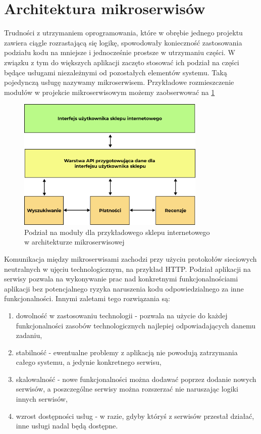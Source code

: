 \documentclass{SGGW-thesis}
\begin{document}
{\section{Architektura mikroserwisów}

Trudności z utrzymaniem oprogramowania, które w obrębie jednego projektu zawiera ciągle rozrastającą się logikę, spowodowały konieczność zastosowania podziału kodu na mniejsze i jednocześnie prostsze w utrzymaniu części.
W związku z tym do większych aplikacji zaczęto stosować ich podział na części będące usługami niezależnymi od pozostałych elementów systemu. Taką pojedynczą usługę nazywamy mikroserwisem. Przykładowe rozmieszczenie modułów w projekcie mikroserwisowym możemy zaobserwować na \cref{fig:microservices_diagram}

\vfill
\clearpage

\begin{figure}[h]
	\centering
	\captionsetup{justification=centering}
	\includegraphics[width=0.8\textwidth]{microservices_diagram.png}
	\caption{Podział na moduły dla przykładowego sklepu internetowego \\ w architekturze mikroserwisowej}
	\label{fig:microservices_diagram}
\end{figure}


Komunikacja między mikroserwisami zachodzi przy użyciu protokołów sieciowych neutralnych w ujęciu technologicznym, na przykład HTTP. Podział aplikacji na serwisy pozwala na wykonywanie prac nad konkretnymi funkcjonalnościami aplikacji bez potencjalnego ryzyka naruszenia kodu odpowiedzialnego za inne funkcjonalności. Innymi zaletami tego rozwiązania są:

\begin{enumerate}
	\item dowolność w zastosowaniu technologii - pozwala na użycie do każdej funkcjonalności zasobów technologicznych najlepiej odpowiadających danemu zadaniu,
	\item stabilność - ewentualne problemy z aplikacją nie powodują zatrzymania całego systemu, a jedynie konkretnego serwisu,
	\item skalowalność - nowe funkcjonalności można dodawać poprzez dodanie nowych serwisów, a poszczególne serwisy można rozszerzać nie naruszając logiki innych serwisów,
	\item wzrost dostępności usług - w razie, gdyby któryś z serwisów przestał działać, inne usługi nadal będą dostępne.
\end{enumerate}

}
\end{document}
